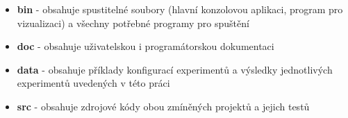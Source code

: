 \documentclass[12pt,a4paper]{report}
\let\openright=\clearpage
\begin{document}



\tableofcontents











\listoffigures

\listoftables


\begin{itemize}
	\item \textbf{bin} - obsahuje spustitelné soubory (hlavní konzolovou aplikaci, program pro vizualizaci) a všechny potřebné programy pro spuštění
	\item \textbf{doc} - obsahuje uživatelskou i programátorskou dokumentaci
	\item \textbf{data} - obsahuje příklady konfigurací experimentů a výsledky jednotlivých experimentů uvedených v této práci 
	\item \textbf{src} - obsahuje zdrojové kódy obou zmíněných projektů a jejich testů  
\end{itemize}

\openright
\end{document}
